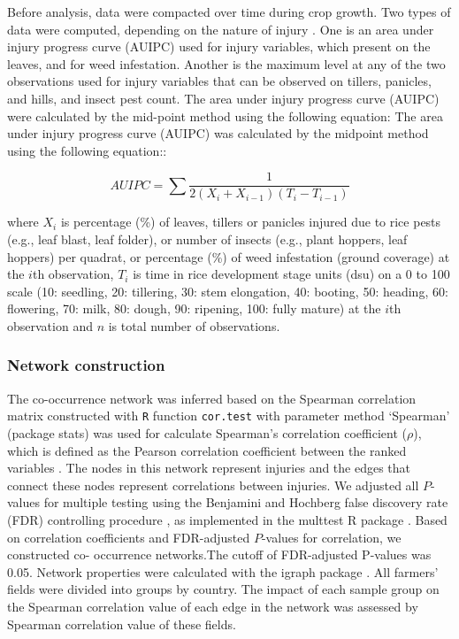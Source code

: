 Before analysis, data were compacted over time during crop growth. Two types of data were computed, depending on the nature of injury \citet{Savary_2009_Survey}. One is an area under injury progress curve (AUIPC) used for injury variables, which present on the leaves, and for weed infestation. Another is the maximum level at any of the two observations used for injury variables that can be observed on tillers, panicles, and hills, and insect pest count. The area under injury progress curve (AUIPC) \citep{Campbell_1990_Introduction} were calculated by the mid-point method using the following equation: The area under injury progress curve (AUIPC) was calculated by the midpoint method using the following equation::

\begin{equation}
AUIPC = \sum{\frac{1}{2(X_{i} + X_{i-1})(T_{i} - T_{i-1})}}
\end{equation}

where $X_i$ is percentage (\%) of leaves, tillers or panicles injured due to rice pests (e.g., leaf blast, leaf folder), or number of insects (e.g., plant hoppers, leaf hoppers) per quadrat, or percentage (\%) of weed infestation (ground coverage) at the $i$th observation, $T_i$ is time in rice development stage units (dsu) on a 0 to 100 scale (10: seedling, 20: tillering, 30: stem elongation, 40: booting, 50: heading, 60: flowering, 70: milk, 80: dough, 90: ripening, 100: fully mature) at the $i$th observation and $n$ is total number of observations.

\subsubsection{Network construction}

The co-occurrence network was inferred based on the Spearman correlation matrix constructed with \texttt{R} function \texttt{cor.test} with parameter method `Spearman' (package stats) was used for calculate Spearman's correlation coefficient ($\rho$), which is defined as the Pearson correlation coefficient between the ranked variables \cite{R_2015}. The nodes in this network represent injuries and the edges that connect these nodes represent correlations between injuries. We adjusted all $P$-values for multiple testing using the Benjamini and Hochberg false discovery rate (FDR) controlling procedure \citep{Benjamini_2006_Adaptive}, as implemented in the multtest R package \citep{Katherine_2005_multtest}. Based on correlation coefficients and FDR-adjusted $P$-values for correlation, we constructed co- occurrence networks.The cutoff of FDR-adjusted P-values was 0.05. Network properties were calculated with the igraph package \citep{Csardi_2010_igraph}. All farmers' fields were divided into groups by country. The impact of each sample group on the Spearman correlation value of each edge in the network was assessed by Spearman correlation value of these fields. 

